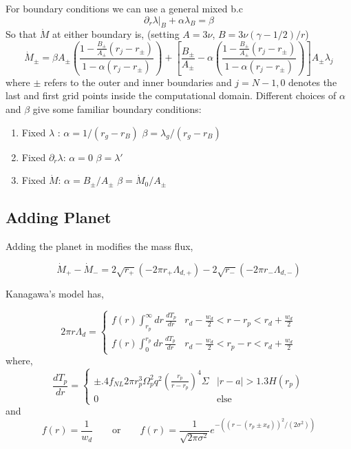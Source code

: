 \documentclass{article}
\begin{document}
For boundary conditions we can use a general mixed b.c
\begin{equation}
\left. \partial_r \lambda \right|_B + \alpha \lambda_B = \beta
\end{equation}
So that $\dot{M}$ at either boundary is, (setting $A = 3 \nu$, $B = 3 \nu (\gamma -1/2)/r$)
\begin{equation}
\dot{M}_{\pm} = \beta A_\pm \left( \frac{1 - \frac{B_\pm}{A_\pm} (r_j - r_\pm)}{1 - \alpha (r_j - r_\pm)} \right)  + \left[ \frac{B_\pm}{A_\pm} - \alpha \left( \frac{ 1 - \frac{B_\pm}{A_\pm}(r_j - r_\pm)}{1 - \alpha (r_j - r_\pm)} \right)  \right] A_\pm  \lambda_j
\end{equation}
where $\pm$ refers to the outer and inner boundaries and $j = N-1,0$ denotes the last and first grid points inside the computational domain. Different choices of $\alpha$ and $\beta$ give some familiar boundary conditions:
\begin{enumerate}
\item Fixed $\lambda$ : \hfill $\alpha = 1/(r_g - r_B)$ \hfill $\beta = \lambda_g/(r_g - r_B)$
\item Fixed $\partial_r \lambda$: \hfill $\alpha = 0$ \hfill $ \beta = \lambda'$
\item Fixed $\dot{M}$: \hfill $\alpha = B_\pm / A_\pm$ \hfill $\beta = \dot{M}_0 / A_\pm$
\end{enumerate}



\subsection{Adding Planet}

Adding the planet in modifies the mass flux,

\begin{equation}
\dot{M}_+ - \dot{M}_- = 2 \sqrt{r_+} \left( -2 \pi r_+ \Lambda_{d,+} \right) - 2 \sqrt{r_-} \left( -2 \pi r_- \Lambda_{d,-} \right)
\end{equation}

Kanagawa's model has,

\begin{equation}
2 \pi r \Lambda_d = 
\begin{cases}
f(r) \int_{r_p}^\infty dr \, \frac{d T_p}{d r}   & r_d - \frac{w_d}{2} < r -r_p  < r_d + \frac{w_d}{2} \\
f(r) \int_{0}^{r_p} dr \, \frac{d T_p}{d r}   & r_d - \frac{w_d}{2} < r_p - r  < r_d + \frac{w_d}{2}
\end{cases}
\end{equation}
where,
\begin{equation}
\frac{d T_p}{d r} = 
\begin{cases}
\pm .4 f_{NL} 2 \pi r_p^3 \Omega_p^2 q^2  \left( \frac{r_p}{r - r_p} \right)^4  \Sigma & |r - a| > 1.3 H(r_p) \\
0 & \text{else}
\end{cases} 
\end{equation}
and 
\begin{equation}
f(r) = \frac{1}{w_d} \qquad \text{or} \qquad f(r) = \frac{1}{\sqrt{2 \pi \sigma^2}} e^{- ((r-(r_p \pm x_d))^2/(2 \sigma^2))}
\end{equation}
\end{document}
